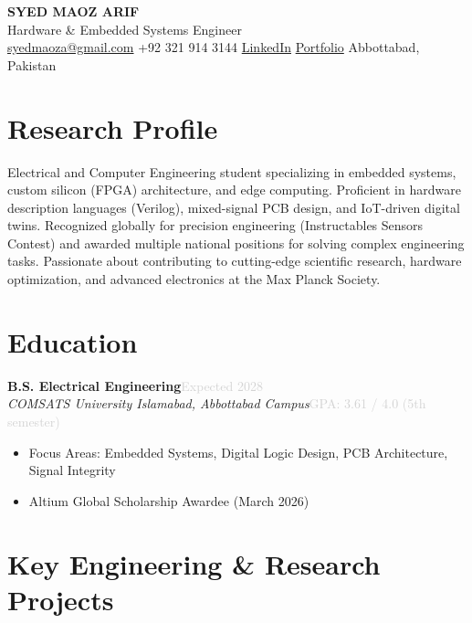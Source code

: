 \documentclass[a4paper,10pt]{article}
\newcommand{\cventry}[4]{%
  {\textbf{#1}}\hfill{\small\textcolor{lightgray}{#2}}\\
  {\textit{#3}}\hfill{\small\textcolor{lightgray}{#4}}\vspace{2pt}
}
\begin{document}
\begin{center}
  {\LARGE\bfseries\color{accent} SYED MAOZ ARIF}\\[4pt]
  {\normalsize Hardware \& Embedded Systems Engineer}\\[3pt]
  {\small
    \href{mailto:syedmaoza@gmail.com}{syedmaoza@gmail.com}\enspace\textbar\enspace
    +92 321 914 3144\enspace\textbar\enspace
    \href{https://www.linkedin.com/in/syed-maoz}{LinkedIn}\enspace\textbar\enspace
    \href{https://buismaoz346-bit.github.io/my-website/}{Portfolio}\enspace\textbar\enspace
    Abbottabad, Pakistan
  }
\end{center}

\vspace{-0.3em}

\section{Research Profile}
Electrical and Computer Engineering student specializing in embedded systems, custom silicon (FPGA) architecture, and edge computing. Proficient in hardware description languages (Verilog), mixed-signal PCB design, and IoT-driven digital twins. Recognized globally for precision engineering (Instructables Sensors Contest) and awarded multiple national positions for solving complex engineering tasks. Passionate about contributing to cutting-edge scientific research, hardware optimization, and advanced electronics at the Max Planck Society.

\section{Education}
\cventry{B.S. Electrical Engineering}{Expected 2028}{COMSATS University Islamabad, Abbottabad Campus}{GPA: 3.61 / 4.0 (5th semester)}
\begin{itemize}
  \item Focus Areas: Embedded Systems, Digital Logic Design, PCB Architecture, Signal Integrity
  \item Altium Global Scholarship Awardee (March 2026)
\end{itemize}

\section{Key Engineering \& Research Projects}
\end{document}
